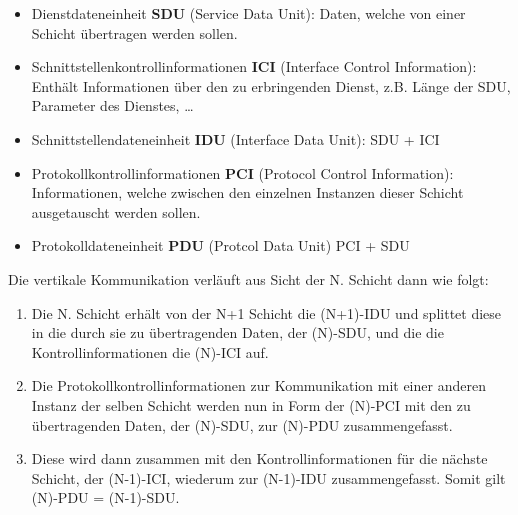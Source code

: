 \documentclass[a4paper,parskip=half*,DIV=15,fontsize=11pt]{scrartcl}
\begin{document}
\begin{itemize}
    \item Dienstdateneinheit \textbf{SDU} (Service Data Unit): Daten, welche von einer Schicht übertragen werden sollen.
    \item Schnittstellenkontrollinformationen \textbf{ICI} (Interface Control Information): Enthält Informationen über den zu erbringenden Dienst, z.B. Länge der SDU, Parameter des Dienstes, \dots
    \item Schnittstellendateneinheit \textbf{IDU} (Interface Data Unit): SDU + ICI
    \item Protokollkontrollinformationen \textbf{PCI} (Protocol Control Information): Informationen, welche zwischen den einzelnen Instanzen dieser Schicht ausgetauscht werden sollen.
    \item Protokolldateneinheit \textbf{PDU} (Protcol Data Unit) PCI + SDU
\end{itemize}

Die vertikale Kommunikation verläuft aus Sicht der N. Schicht dann wie folgt:

\begin{enumerate}
	\item Die N. Schicht erhält von der N+1 Schicht die (N+1)-IDU und splittet diese in die durch sie zu übertragenden Daten, der (N)-SDU, und die die Kontrollinformationen die (N)-ICI auf.
    \item Die Protokollkontrollinformationen zur Kommunikation mit einer anderen Instanz der selben Schicht werden nun in Form der (N)-PCI mit den zu übertragenden Daten, der (N)-SDU, zur (N)-PDU zusammengefasst.
    \item Diese wird dann zusammen mit den Kontrollinformationen für die nächste Schicht, der (N-1)-ICI, wiederum zur (N-1)-IDU zusammengefasst. Somit gilt (N)-PDU = (N-1)-SDU.
\end{enumerate}
\end{document}
